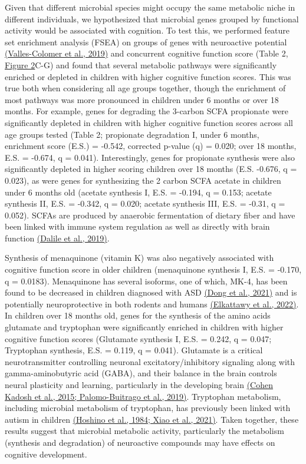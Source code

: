 Given that different microbial species might occupy the same metabolic
niche in different individuals, we hypothesized that microbial genes
grouped by functional activity would be associated with cognition. To
test this, we performed feature set enrichment analysis (FSEA) on groups
of genes with neuroactive potential
\href{https://www.zotero.org/google-docs/?xQURsj}{(Valles-Colomer et
al., 2019)} and concurrent cognitive function score (Table 2,
\protect\hyperlink{_i7fd3z19jdvg}{\uline{Figure 2}}C-G) and found that
several metabolic pathways were significantly enriched or depleted in
children with higher cognitive function scores. This was true both when
considering all age groups together, though the enrichment of most
pathways was more pronounced in children under 6 months or over 18
months. For example, genes for degrading the 3-carbon SCFA propionate
were significantly depleted in children with higher cognitive function
scores across all age groups tested (Table 2; propionate degradation I,
under 6 months, enrichment score (E.S.) = -0.542, corrected p-value (q)
= 0.020; over 18 months, E.S. = -0.674, q = 0.041). Interestingly, genes
for propionate synthesis were also significantly depleted in higher
scoring children over 18 months (E.S. -0.676, q = 0.023), as were genes
for synthesizing the 2 carbon SCFA acetate in children under 6 months
old (acetate synthesis I, E.S. = -0.194, q = 0.153; acetate synthesis
II, E.S. = -0.342, q = 0.020; acetate synthesis III, E.S. = -0.31, q =
0.052). SCFAs are produced by anaerobic fermentation of dietary fiber
and have been linked with immune system regulation as well as directly
with brain function
\href{https://www.zotero.org/google-docs/?2Z0sKZ}{(Dalile et al.,
2019)}.

Synthesis of menaquinone (vitamin K) was also negatively associated with
cognitive function score in older children (menaquinone synthesis I,
E.S. = -0.170, q = 0.0183). Menaquinone has several isoforms, one of
which, MK-4, has been found to be decreased in children diagnosed with
ASD \href{https://www.zotero.org/google-docs/?dTA3NO}{(Dong et al.,
2021)} and is potentially neuroprotective in both rodents and humans
\href{https://paperpile.com/c/dPbU4e/cTO9}{(Elkattawy et al., 2022)}. In
children over 18 months old, genes for the synthesis of the amino acids
glutamate and tryptophan were significantly enriched in children with
higher cognitive function scores (Glutamate synthesis I, E.S. = 0.242, q
= 0.047; Tryptophan synthesis, E.S. = 0.119, q = 0.041). Glutamate is a
critical neurotransmitter controlling neuronal excitatory/inhibitory
signaling along with gamma-aminobutyric acid (GABA), and their balance
in the brain controls neural plasticity and learning, particularly in
the developing brain
\href{https://www.zotero.org/google-docs/?QubMhx}{(Cohen Kadosh et al.,
2015; Palomo-Buitrago et al., 2019)}. Tryptophan metabolism, including
microbial metabolism of tryptophan, has previously been linked with
autism in children
\href{https://www.zotero.org/google-docs/?GPaUZE}{(Hoshino et al., 1984;
Xiao et al., 2021)}. Taken together, these results suggest that
microbial metabolic activity, particularly the metabolism (synthesis and
degradation) of neuroactive compounds may have effects on cognitive
development.

